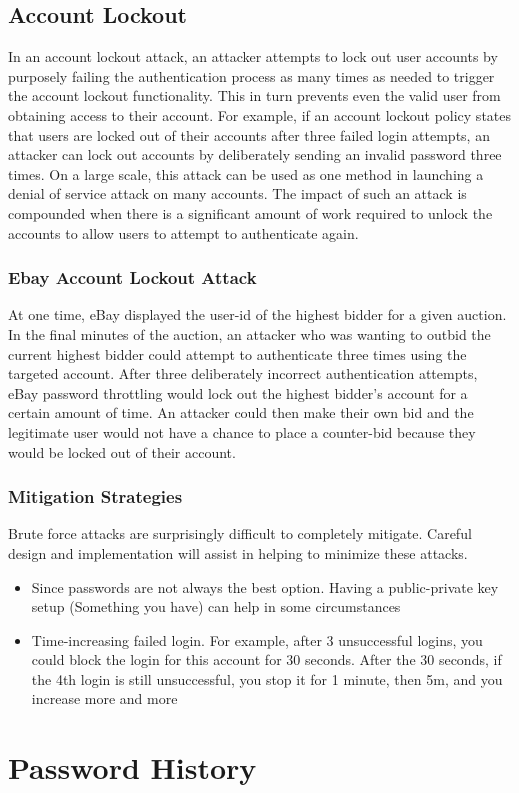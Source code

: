 \documentclass[a4paper, titlepage]{article}
\begin{document}
\subsection{Account Lockout}

In an account lockout attack, an attacker attempts to lock out user accounts by purposely failing the authentication process as many times as needed to trigger the account lockout functionality. This in turn prevents even the valid user from obtaining access to their account. For example, if an account lockout policy states that users are locked out of their accounts after three failed login attempts, an attacker can lock out accounts by deliberately sending an invalid password three times. On a large scale, this attack can be used as one method in launching a denial of service attack on many accounts. The impact of such an attack is compounded when there is a significant amount of work required to unlock the accounts to allow users to attempt to authenticate again.

\subsubsection{Ebay Account Lockout Attack}
At one time, eBay displayed the user-id of the highest bidder for a given auction. In the final minutes of the auction, an attacker who was wanting to outbid the current highest bidder could attempt to authenticate three times using the targeted account. After three deliberately incorrect authentication attempts, eBay password throttling would lock out the highest bidder's account for a certain amount of time. An attacker could then make their own bid and the legitimate user would not have a chance to place a counter-bid because they would be locked out of their account.

\subsubsection{Mitigation Strategies}
Brute force attacks are surprisingly difficult to completely mitigate. Careful design and implementation will assist in helping to minimize these attacks.
\begin{itemize}
    \item Since passwords are not always the best option. Having a public-private key setup (Something you have) can help in some circumstances
    \item Time-increasing failed login. For example, after 3 unsuccessful logins, you could block the login for this account for 30 seconds. After the 30 seconds, if the 4th login is still unsuccessful, you stop it for 1 minute, then 5m, and you increase more and more
\end{itemize}
\newpage
\section{Password History}
\end{document}
